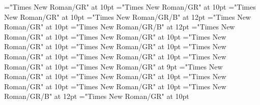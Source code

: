 \documentclass[gps1,twoside]{article}
\begin{document}
\font\spanspanabbreviationvariantentrytypevariantentrytypesvisiblevariantentryrefvisiblevariantentryrefsminorentryvariantbefore="Times New Roman/GR" at 10pt
\font\spanabbreviationvariantentrytypevariantentrytypesvisiblevariantentryrefvisiblevariantentryrefsminorentryvariantlastchildafter="Times New Roman/GR" at 10pt
\font{}="Times New Roman/GR" at 10pt
\font\spanbzhheadwordreferencedentryreferencedentriesvisiblevariantentryrefvisiblevariantentryrefsminorentryvariant="Times New Roman/GR/B" at 12pt
\font\spanspanheadwordreferencedentryreferencedentriesvisiblevariantentryrefvisiblevariantentryrefsminorentryvariantbefore="Times New Roman/GR" at 10pt
\font\spanheadwordreferencedentryreferencedentriesvisiblevariantentryrefvisiblevariantentryrefsminorentryvariant="Times New Roman/GR/B" at 12pt
\font\spanspandefinitionorglossreferencedentryreferencedentriesvisiblevariantentryrefvisiblevariantentryrefsminorentryvariantbefore="Times New Roman/GR" at 10pt
\font\spandefinitionorglossreferencedentryreferencedentriesvisiblevariantentryrefvisiblevariantentryrefsminorentryvariantfirstchildbefore="Times New Roman/GR" at 10pt
\font\spanspansummaryvisiblevariantentryrefvisiblevariantentryrefsminorentryvariantbefore="Times New Roman/GR" at 10pt
\font\spansummaryvisiblevariantentryrefvisiblevariantentryrefsminorentryvariantfirstchildbefore="Times New Roman/GR" at 10pt
\font\spanspancomplexformentryrefsminorentryvariantbefore="Times New Roman/GR" at 10pt
\font\complexformentryrefsminorentryvariantbefore="Times New Roman/GR" at 10pt
\font\complexformentryrefsminorentryvariantafter="Times New Roman/GR" at 10pt
\font\complexformtypecomplexformtypecomplexformtypescomplexformentryrefcomplexformentryrefsminorentryvariantbefore="Times New Roman/GR" at 9pt
\font\complexformtypescomplexformentryrefcomplexformentryrefsminorentryvariantafter="Times New Roman/GR" at 10pt
\font\spanspanabbreviationcomplexformtypecomplexformtypescomplexformentryrefcomplexformentryrefsminorentryvariantbefore="Times New Roman/GR" at 10pt
\font\spanabbreviationcomplexformtypecomplexformtypescomplexformentryrefcomplexformentryrefsminorentryvariantlastchildafter="Times New Roman/GR" at 10pt
\font{}="Times New Roman/GR" at 10pt
\font\spanbzhheadwordreferencedentryreferencedentriescomplexformentryrefcomplexformentryrefsminorentryvariant="Times New Roman/GR/B" at 12pt
\font\spanspanheadwordreferencedentryreferencedentriescomplexformentryrefcomplexformentryrefsminorentryvariantbefore="Times New Roman/GR" at 10pt
\end{document}
